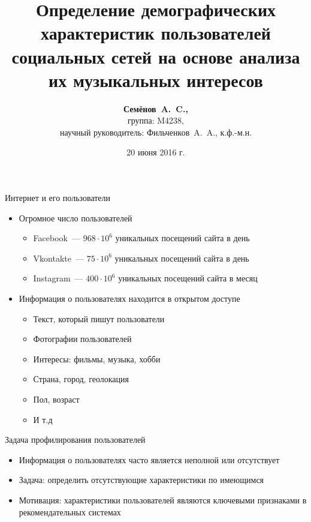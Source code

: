 \documentclass{beamer}
\title{Определение демографических характеристик пользователей
социальных сетей на основе анализа их музыкальных интересов}
\author{\textbf{Семёнов~A.~C.,} \\ 
    группа: M4238, \\
    научный руководитель: Фильченков~A.~A., к.ф.-м.н.}
\institute{Университет ИТМО}
\date{20 июня 2016 г.}
\begin{document}
\begin{frame}
  \titlepage
\end{frame}

\begin{frame}{Интернет и его пользователи}
  \begin{itemize}
      \item {Огромное число пользователей}
          \begin{itemize}
              \item {Facebook~--- $968 \cdot 10^{6}$ уникальных посещений сайта в день}
              \item {Vkontakte~--- $75 \cdot 10^{6}$ уникальных посещений сайта в день}
              \item {Instagram~--- $400 \cdot 10^{6}$ уникальных посещений сайта в месяц}
          \end{itemize}
      \item {Информация о пользователях находится в открытом доступе}
          \begin{itemize}
              \item {Текст, который пишут пользователи}
              \item {Фотографии пользователей}
              \item {Интересы: фильмы, музыка, хобби}
              \item {Страна, город, геолокация}
              \item {Пол, возраст}
              \item {И т.д}
          \end{itemize}
  \end{itemize}
\end{frame}

\begin{frame}{Задача профилирования пользователей}
  \begin{itemize}
      \item {Информация о пользователях часто является неполной или отсутствует}
      \item {Задача: определить отсутствующие характеристики по имеющимся}
      \item {Мотивация: характеристики пользователей являются
          ключевыми признаками в рекомендательных системах}
  \end{itemize}
\end{frame}
\end{document}
